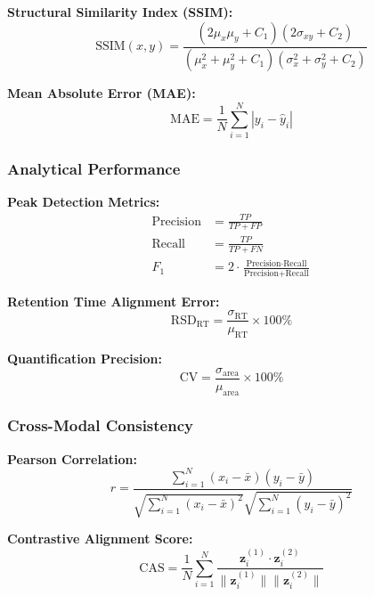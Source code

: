 \documentclass[12pt,a4paper]{article}
\begin{document}
\textbf{Structural Similarity Index (SSIM):}
\begin{equation}
\text{SSIM}(x, y) = \frac{(2\mu_x\mu_y + C_1)(2\sigma_{xy} + C_2)}{(\mu_x^2 + \mu_y^2 + C_1)(\sigma_x^2 + \sigma_y^2 + C_2)}
\end{equation}

\textbf{Mean Absolute Error (MAE):}
\begin{equation}
\text{MAE} = \frac{1}{N}\sum_{i=1}^{N} |y_i - \hat{y}_i|
\end{equation}

\subsubsection{Analytical Performance}

\textbf{Peak Detection Metrics:}
\begin{align}
\text{Precision} &= \frac{TP}{TP + FP} \\
\text{Recall} &= \frac{TP}{TP + FN} \\
F_1 &= 2 \cdot \frac{\text{Precision} \cdot \text{Recall}}{\text{Precision} + \text{Recall}}
\end{align}

\textbf{Retention Time Alignment Error:}
\begin{equation}
\text{RSD}_{\text{RT}} = \frac{\sigma_{\text{RT}}}{\mu_{\text{RT}}} \times 100\%
\end{equation}

\textbf{Quantification Precision:}
\begin{equation}
\text{CV} = \frac{\sigma_{\text{area}}}{\mu_{\text{area}}} \times 100\%
\end{equation}

\subsubsection{Cross-Modal Consistency}

\textbf{Pearson Correlation:}
\begin{equation}
r = \frac{\sum_{i=1}^{N}(x_i - \bar{x})(y_i - \bar{y})}{\sqrt{\sum_{i=1}^{N}(x_i - \bar{x})^2}\sqrt{\sum_{i=1}^{N}(y_i - \bar{y})^2}}
\end{equation}

\textbf{Contrastive Alignment Score:}
\begin{equation}
\text{CAS} = \frac{1}{N}\sum_{i=1}^{N} \frac{\mathbf{z}_i^{(1)} \cdot \mathbf{z}_i^{(2)}}{\|\mathbf{z}_i^{(1)}\| \|\mathbf{z}_i^{(2)}\|}
\end{equation}
\end{document}
